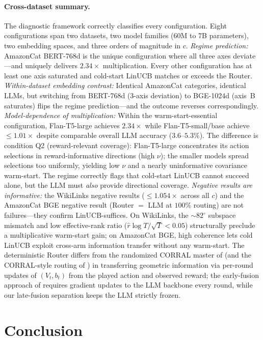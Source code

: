 \documentclass{article}
\theoremstyle{definition}
\theoremstyle{remark}
\theoremstyle{remark}
\begin{document}
\paragraph{Cross-dataset summary.}
The diagnostic framework correctly classifies every configuration. Eight
configurations span two datasets, two model families (60M to 7B parameters),
two embedding spaces, and three orders of magnitude in $c$.
\emph{Regime prediction:} AmazonCat BERT-768d is the unique configuration
where all three axes deviate---and uniquely delivers $2.34\times$
multiplication. Every other configuration has at least one axis saturated
and cold-start LinUCB matches or exceeds the Router.
\emph{Within-dataset embedding contrast:} Identical AmazonCat categories,
identical LLMs, but switching from BERT-768d (3-axis deviation) to
BGE-1024d (axis~B saturates) flips the regime prediction---and the outcome
reverses correspondingly.
\emph{Model-dependence of multiplication:} Within the warm-start-essential
configuration, Flan-T5-large achieves $2.34\times$ while Flan-T5-small/base
achieve $\le 1.01\times$ despite comparable overall LLM accuracy
($3.6$--$5.3\%$). The difference is condition Q2 (reward-relevant coverage):
Flan-T5-large concentrates its action selections in reward-informative
directions (high $\nu$); the smaller models spread selections too uniformly,
yielding low $\nu$ and a nearly uninformative covariance warm-start. The
regime correctly flags that cold-start LinUCB cannot succeed alone, but the
LLM must \emph{also} provide directional coverage.
\emph{Negative results are informative:} the WikiLinks negative results
($\le 1.054\times$ across all $c$) and the AmazonCat BGE negative result
(Router $=$ LLM at $100\%$ routing) are not failures---they confirm
LinUCB-suffices. On WikiLinks, the $\sim 82^\circ$ subspace mismatch and low
effective-rank ratio ($\widehat r\log T/\sqrt T < 0.05$) structurally
preclude a multiplicative warm-start gain; on AmazonCat BGE, high coherence
lets cold LinUCB exploit cross-arm information transfer without any
warm-start. The deterministic Router differs from the randomized CORRAL
master of \cite{agarwal2017corralling} (and the CORRAL-style routing of
\cite{chen2024llmdecision}) in transferring geometric information via
per-round updates of $(V_t,b_t)$ from the played action and observed reward;
the early-fusion approach of \cite{huangcontextual} requires gradient
updates to the LLM backbone every round, while our late-fusion separation
keeps the LLM strictly frozen.


\section{Conclusion}
\label{sec:conclusion}
\end{document}
